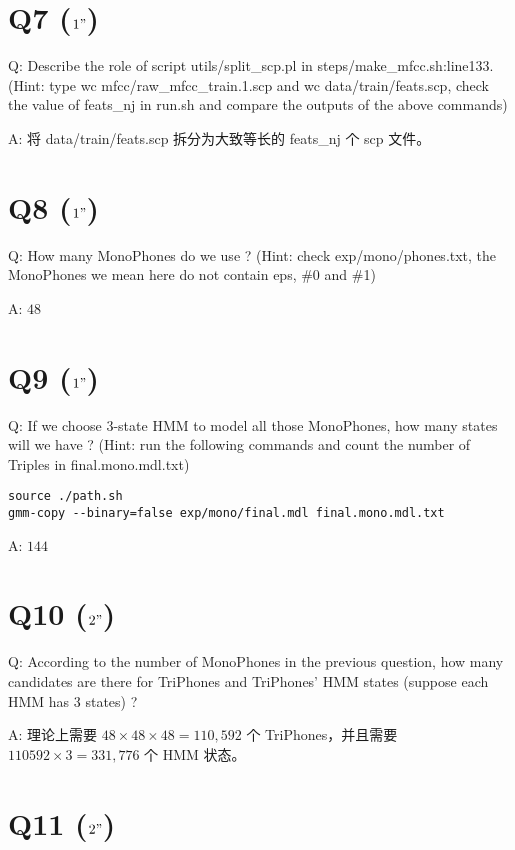 \documentclass[degree=project,degree-type=project,cjk-font=noto]{thuthesis}
\begin{document}
\section{Q7 ($1"$)}

Q: Describe the role of script utils/split\_scp.pl in steps/make\_mfcc.sh:line133. (Hint: type wc mfcc/raw\_mfcc\_train.1.scp and wc data/train/feats.scp, check the value of feats\_nj in run.sh and compare the outputs of the above commands)

A: 将 data/train/feats.scp 拆分为大致等长的 feats\_nj 个 scp 文件。

\section{Q8 ($1"$)}

Q: How many MonoPhones do we use ? (Hint: check exp/mono/phones.txt, the MonoPhones we mean here do not contain eps, \#0 and \#1)

A: $48$

\section{Q9 ($1"$)}

Q: If we choose 3-state HMM to model all those MonoPhones, how many states will we have ? (Hint: run the following commands and count the number of Triples in final.mono.mdl.txt)

  \begin{verbatim}
source ./path.sh
gmm-copy --binary=false exp/mono/final.mdl final.mono.mdl.txt
  \end{verbatim}

A: $144$

\section{Q10 ($2"$)}

Q: According to the number of MonoPhones in the previous question, how many candidates are there for TriPhones and TriPhones' HMM states (suppose each HMM has 3 states) ?

A: 理论上需要 $48 \times 48 \times 48 = 110,592$ 个 TriPhones，并且需要 $110592 \times 3 = 331,776$ 个 HMM 状态。

\section{Q11 ($2"$)}
\end{document}
